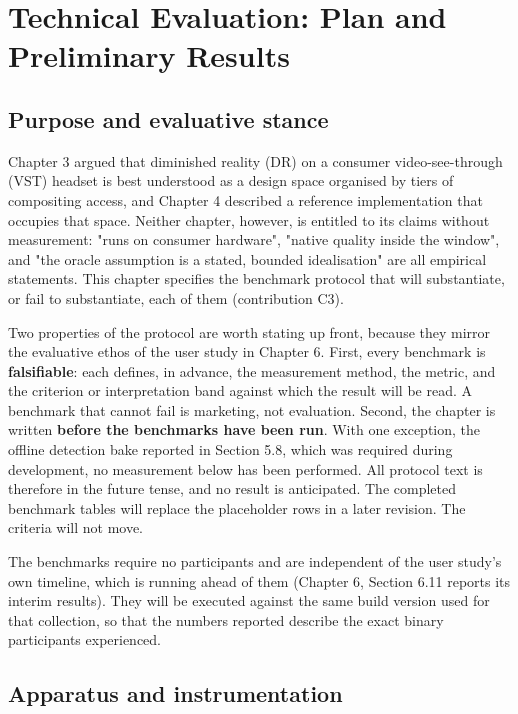 \chapter{Technical Evaluation: Plan and Preliminary Results}

\section{Purpose and evaluative stance}

Chapter 3 argued that diminished reality (DR) on a consumer video-see-through (VST) headset is best
understood as a design space organised by tiers of compositing access, and Chapter 4 described a
reference implementation that occupies that space. Neither chapter, however, is entitled to its
claims without measurement: "runs on consumer hardware", "native quality inside the window", and
"the oracle assumption is a stated, bounded idealisation" are all empirical statements. This chapter
specifies the benchmark protocol that will substantiate, or fail to substantiate, each of them
(contribution C3).

Two properties of the protocol are worth stating up front, because they mirror the evaluative ethos
of the user study in Chapter 6. First, every benchmark is \textbf{falsifiable}: each defines, in advance,
the measurement method, the metric, and the criterion or interpretation band against which the
result will be read. A benchmark that cannot fail is marketing, not evaluation. Second, the chapter
is written \textbf{before the benchmarks have been run}. With one exception, the offline detection bake
reported in Section 5.8, which was required during development, no measurement below has been
performed. All protocol text is therefore in the future tense, and no result is anticipated. The
completed benchmark tables will replace the placeholder rows in a later revision. The criteria will
not move.

The benchmarks require no participants and are independent of the user study's own timeline, which
is running ahead of them (Chapter 6, Section 6.11 reports its interim results). They will be executed
against the same build version used for that collection, so that the numbers reported describe the
exact binary participants experienced.

\section{Apparatus and instrumentation}


